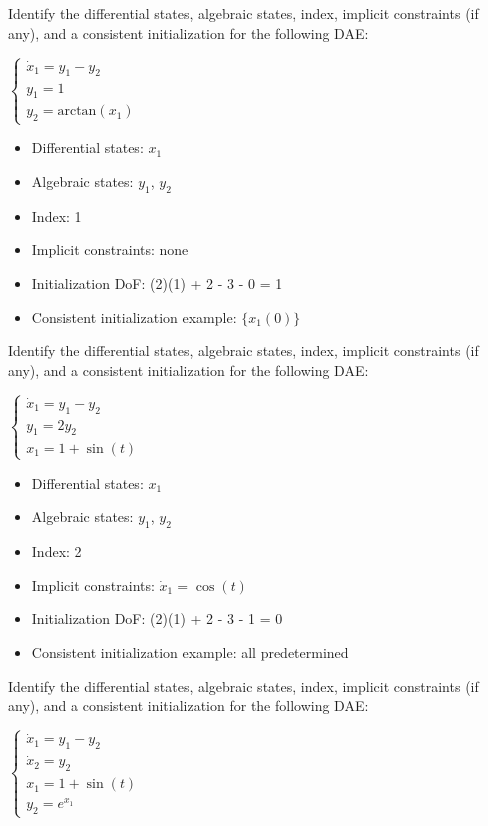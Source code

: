 \begin{exercise}
Identify the differential states, algebraic states, index, implicit constraints (if any), and a consistent initialization for the following DAE:

$\displaystyle \begin{cases}
    \dot{x}_1 = y_1 - y_2 \\
    y_1 = 1 \\
    y_2 = \mathrm{arctan}(x_1)
    \end{cases}$
\end{exercise}
\begin{solution}
\begin{itemize}
    \item Differential states: $x_1$
    \item Algebraic states: $y_1$, $y_2$
    \item Index: 1
    \item Implicit constraints: none
    \item Initialization DoF: (2)(1) + 2 - 3 - 0 = 1
    \item Consistent initialization example: $\{x_1(0)\}$
\end{itemize}
\end{solution}
\begin{exercise}
Identify the differential states, algebraic states, index, implicit constraints (if any), and a consistent initialization for the following DAE:

$\displaystyle \begin{cases}
    \dot{x}_1 = y_1 - y_2 \\
    y_1 = 2y_2 \\
    x_1 = 1 + \sin(t)
    \end{cases}$
\end{exercise}
\begin{solution}
\begin{itemize}
    \item Differential states: $x_1$
    \item Algebraic states: $y_1$, $y_2$
    \item Index: 2
    \item Implicit constraints: $\dot{x}_1 = \cos(t)$
    \item Initialization DoF: (2)(1) + 2 - 3 - 1 = 0
    \item Consistent initialization example: all predetermined
\end{itemize}
\end{solution}
\begin{exercise}
Identify the differential states, algebraic states, index, implicit constraints (if any), and a consistent initialization for the following DAE:

$ \displaystyle \begin{cases}
    \dot{x}_1 = y_1 - y_2 \\
    \dot{x}_2 = y_2 \\
    x_1 = 1 + \sin(t) \\
    y_2 = e^{x_1}
    \end{cases}$
\end{exercise}
